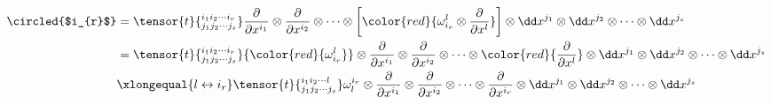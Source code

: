 \[
\begin{split}
\circled{$i_{r}$}&=\tensor{t}{^{i_{1}i_{2}\cdots i_{r}}_{j_{1}j_{2}\cdots j_{s}}}\frac { \partial } { \partial x ^ { i_{1} } }\otimes\frac { \partial } { \partial x ^ { i_{2} } }\otimes\cdots\otimes \left[{\color{red}{\omega_{i_{r}}^{l}\otimes\frac { \partial } { \partial x ^ { l} }}}\right]\otimes \dd x^{j_{1}}\otimes\dd x^{j_{2}}\otimes\cdots\otimes \dd x^{j_{s}}\\
&=\tensor{t}{^{i_{1}i_{2}\cdots i_{r}}_{j_{1}j_{2}\cdots j_{s}}}{\color{red}{\omega_{i_{r}}^{l}}}\otimes\frac { \partial } { \partial x ^ { i_{1} } }\otimes\frac { \partial } { \partial x ^ { i_{2} } }\otimes\cdots\otimes {\color{red}{\frac { \partial } { \partial x ^ { l} }}}\otimes \dd x^{j_{1}}\otimes\dd x^{j_{2}}\otimes\cdots\otimes \dd x^{j_{s}}\\
&\xlongequal{l\leftrightarrow i_{r}}\tensor{t}{^{i_{1}i_{2}\cdots l}_{j_{1}j_{2}\cdots j_{s}}}\omega_{l}^{i_{r}}\otimes\frac { \partial } { \partial x ^ { i_{1} } }\otimes\frac { \partial } { \partial x ^ { i_{2} } }\otimes\cdots\otimes \frac { \partial } { \partial x ^ { i_{r}} }\otimes \dd x^{j_{1}}\otimes\dd x^{j_{2}}\otimes\cdots\otimes \dd x^{j_{s}}
\end{split}
\]

